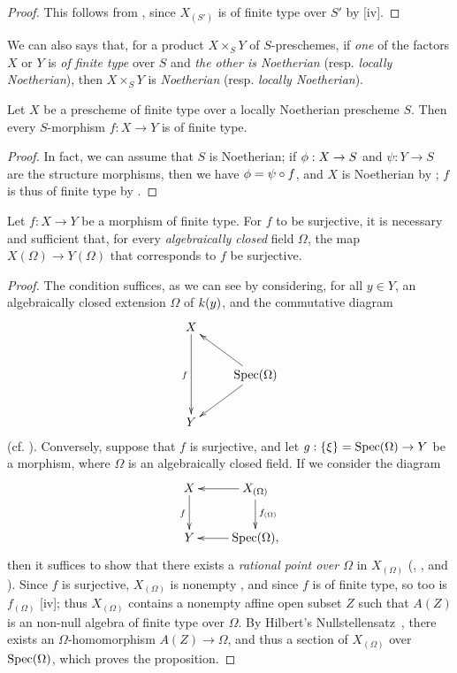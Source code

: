 \begin{proof}
\label{proof-I.6.3.8}
This follows from , since $X_{(S')}$ is of finite type over $S'$ by [iv].
\end{proof}

We can also says that, for a product $X\times_S Y$ of $S$-preschemes, if \emph{one} of the factors
$X$ or $Y$ is \emph{of finite type} over $S$ and \emph{the other is Noetherian} (resp. \emph{locally Noetherian}), then $X\times_S Y$ is \emph{Noetherian} (resp. \emph{locally Noetherian}).

\begin{corollary}[6.3.9]
\label{I.6.3.9}
Let $X$ be a prescheme of finite type over a locally Noetherian prescheme $S$.
Then every $S$-morphism $f:X\to Y$ is of finite type.
\end{corollary}

\begin{proof}
\label{proof-I.6.3.9}
In fact, we can assume that $S$ is Noetherian;
if $\vphi:X\to S$ and $\psi:Y\to S$ are the structure morphisms, then we have $\phi=\psi\circ f$, and $X$ is Noetherian by ;
$f$ is thus of finite type by .
\end{proof}

\begin{proposition}[6.3.10]
\label{I.6.3.10}
Let $f:X\to Y$ be a morphism of finite type.
For $f$ to be surjective, it is necessary and sufficient that, for every \emph{algebraically closed} field $\Omega$, the map $X(\Omega)\to Y(\Omega)$ that corresponds to $f$  be surjective.
\end{proposition}

\begin{proof}
\label{proof-I.6.3.10}
The condition suffices, as we can see by considering, for all $y\in Y$, an algebraically closed extension $\Omega$ of $k(y)$, and the commutative diagram
\[
  \xymatrix{
    X\ar[dd]_f\\
    & \Spec(\Omega)\ar[ul]\ar[dl]\\
    Y
  }
\]
(cf. ).
Conversely, suppose that $f$ is surjective, and let $g:\{\xi\}=\Spec(\Omega)\to Y$ be a morphism, where $\Omega$ is an algebraically closed field.
If we consider the diagram
\[
  \xymatrix{
    X\ar[d]_f &
    X_{(\Omega)}\ar[l]\ar[d]^{f_{(\Omega)}}\\
    Y &
    \Spec(\Omega),\ar[l]
  }
\]
then it suffices to show that there exists a \emph{rational point over $\Omega$} in $X_{(\Omega)}$ (, , and ).
Since $f$ is surjective, $X_{(\Omega)}$ is nonempty , and since $f$ is of finite type, so too is $f_{(\Omega)}$ [iv];
thus $X_{(\Omega)}$ contains a nonempty affine open subset $Z$ such that $A(Z)$ is an non-null algebra of finite type over $\Omega$.
By Hilbert's Nullstellensatz~\cite{I-21}, there exists an $\Omega$-homomorphism $A(Z)\to\Omega$, and thus a section of $X_{(\Omega)}$ over $\operatorname{Spec}(\Omega)$, which proves the proposition.
\end{proof}

